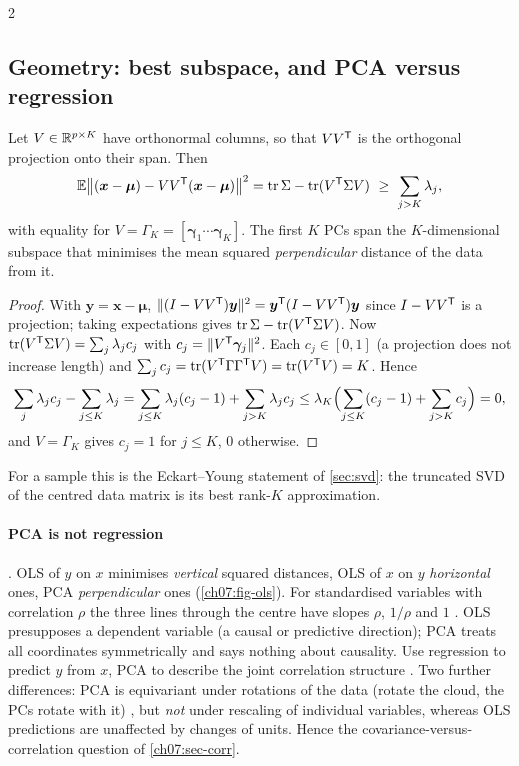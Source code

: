 \begin{paracol}{2}
\subsection{Geometry: best subspace, and PCA versus regression}\label{ch07:sec-geom}

\begin{proposition}\label{ch07:prop-best}
Let $V\in\mathbb{R}^{p\times K}$ have orthonormal columns, so that $VV^{\mathsf T}$ is the orthogonal projection onto their span.
Then
\[
  \E\bigl\|(\bm x-\bm\mu)-VV\T(\bm x-\bm\mu)\bigr\|^2=\tr\Sigma-\tr(V\T\Sigma V)\ \ge\ \sum_{j>K}\lambda_j ,
\]
with equality for $V=\Gamma_K=[\bm\gamma_1\cdots\bm\gamma_K]$. The first $K$ PCs span the $K$-dimensional subspace that
minimises the mean squared \emph{perpendicular} distance of the data from it.
\end{proposition}
\begin{proof}
With $\bm y=\bm x-\bm\mu$, $\|(I-VV^{\mathsf T})\bm y\|^2=\bm y^{\mathsf T}(I-VV^{\mathsf T})\bm y$ since $I-VV^{\mathsf T}$ is a projection; taking expectations gives
$\operatorname{tr}\Sigma-\operatorname{tr}(V^{\mathsf T}\Sigma V)$. Now $\operatorname{tr}(V^{\mathsf T}\Sigma V)=\sum_j\lambda_jc_j$ with $c_j=\|V^{\mathsf T}\bm\gamma_j\|^2$. Each
$c_j\in[0,1]$ (a projection does not increase length) and $\sum_jc_j=\operatorname{tr}(V^{\mathsf T}\Gamma\Gamma^{\mathsf T} V)=\operatorname{tr}(V^{\mathsf T} V)=K$. Hence
\[
  \sum_j\lambda_jc_j-\sum_{j\le K}\lambda_j=\sum_{j\le K}\lambda_j(c_j-1)+\sum_{j>K}\lambda_jc_j
  \le\lambda_K\Bigl(\sum_{j\le K}(c_j-1)+\sum_{j>K}c_j\Bigr)=0,
\]
and $V=\Gamma_K$ gives $c_j=1$ for $j\le K$, $0$ otherwise.
\end{proof}
For a sample this is the Eckart--Young statement of \cref{sec:svd}: the truncated SVD of the centred data
matrix is its best rank-$K$ approximation.

\paragraph{PCA is not regression} . OLS of $y$ on $x$ minimises \emph{vertical} squared
distances, OLS of $x$ on $y$ \emph{horizontal} ones, PCA \emph{perpendicular} ones (\cref{ch07:fig-ols}).
For standardised variables with correlation $\rho$ the three lines through the centre have slopes $\rho$,
$1/\rho$ and $1$ . OLS presupposes a dependent variable (a causal or predictive
direction); PCA treats all coordinates symmetrically and says nothing about causality. Use regression to
predict $y$ from $x$, PCA to describe the joint correlation structure . Two further
differences: PCA is equivariant under rotations of the data (rotate the cloud, the PCs rotate with it)
, but \emph{not} under rescaling of individual variables, whereas OLS predictions are
unaffected by changes of units. Hence the covariance-versus-correlation question of
\cref{ch07:sec-corr}.


\end{paracol}
